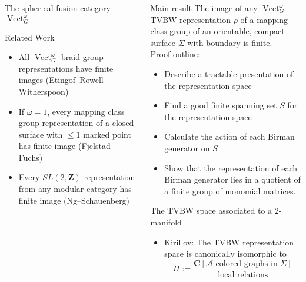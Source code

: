 \documentclass[final,t, mathserif]{beamer}
\DeclareMathOperator{\Vect}{Vect}
\theoremstyle{plain}
\theoremstyle{definition}
\begin{document}
\begin{frame}{}
\begin{columns}[t]
\begin{column}{.3\linewidth}
\begin{block}{The spherical fusion category $\Vect^\omega_G$}
\end{block}


\begin{block}{Related Work}
  \begin{itemize}
  \item All $\Vect_G^\omega$ braid group representations have finite images (Etingof--Rowell--Witherspoon)

  \item  If $\omega = 1$, every mapping class group representation of a closed surface with $\le 1$ marked point has finite image
(Fjelstad--Fuchs)

  \item Every $SL(2,\mathbf{Z})$ representation from any modular category has finite image (Ng--Schauenberg)
  \end{itemize}
\end{block}

\end{column}
\begin{column}{.3\linewidth}




\begin{block}{Main result}
The image of any $\Vect^\omega_G$ TVBW representation $\rho$ of a mapping class group of an orientable, compact surface $\Sigma$ with boundary is finite.
\\ \vspace{1cm}
Proof outline:
\begin{itemize}
  \item Describe a tractable presentation of  the representation space
  \item Find a good finite spanning set $S$ for the representation space
  \item Calculate the action of each Birman generator on $S$
  \item Show that the representation of each Birman generator lies in a quotient of a finite group of monomial matrices.  
\end{itemize}
\end{block}

\begin{block}{The TVBW space associated to a 2-manifold}
  \begin{itemize}
    \item 
        Kirillov: The TVBW representation space is canonically isomorphic to
        \[
        H := \frac{\mathbf{C}[\text{$\mathcal A$-colored graphs in $\Sigma$}] }
        {\text{local relations}}
       \]
  \end{itemize}


\end{block}
\end{column}
\end{columns}
\end{frame}
\end{document}
